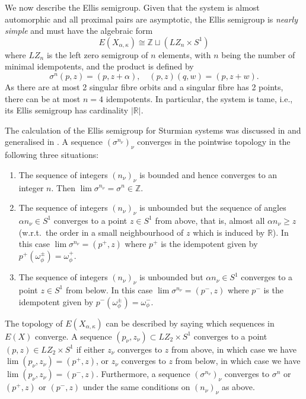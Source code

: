\documentclass[12pt]{amsart}
\theoremstyle{definition}
\numberwithin{equation}{section}
\newcommand{\Z}{\mathbb Z}
\newcommand{\R}{\mathbb{R}}
\newcommand{\al}{\alpha}
\newcommand{\cut}{\kappa}
\begin{document}
We now describe the Ellis semigroup. Given that the system is almost automorphic and all proximal pairs are asymptotic, the Ellis semigroup is {\em nearly simple} \cite{Barge-Kellendonk} and must have the algebraic form
$$E(X_{\al,\cut}) \cong \Z\sqcup ( LZ_n\times S^1) $$
where $LZ_n$ is the left zero semigroup of $n$ elements, with $n$ being the number of minimal idempotents, and the product is defined by
$$ \sigma^n (p,z) = (p,z+\al),\quad (p,z)(q,w) = (p,z+w). $$
As there are at most 2 singular fibre orbits and a singular fibre has 2 points, there can be at most $n=4$ idempotents. In particular, the system is tame, i.e., its Ellis semigroup has cardinality $|\mathbb R|$.
 
The calculation of the Ellis semigroup for Sturmian systems was discussed in \cite[Example 14.10]{GlasnerMegrelishvili2006} and generalised in \cite{Aujogue}.  %
A sequence $(\sigma^{n_\nu})_\nu$ converges in the pointwise topology in the following three situations:
\begin{enumerate}
\item The sequence of integers $(n_\nu)_\nu$ is bounded and hence converges to an integer $n$. Then $\lim \sigma^{n_\nu} = \sigma^n \in \Z$.
\item The sequence of integers $(n_\nu)_\nu$ is unbounded but the sequence of angles $\al n_\nu\in S^1$ converges to a point $z\in S^1$ from above, that is, almost all  $\al n_\nu\geq z$ (w.r.t.\ the order in a small neighbourhood of $z$ which is induced by $\R$). In this case  $\lim \sigma^{n_\nu} = (p^+,z)$ where $p^+$ is the idempotent given by $p^+(\omega_\phi^\pm) = \omega^+_\phi$.
\item The sequence of integers $(n_\nu)_\nu$ is unbounded but $\al n_\nu\in S^1$ converges to a point $z\in S^1$ from below. %
In this case  $\lim \sigma^{n_\nu} = (p^-,z)$ where $p^-$ is the idempotent given by $p^-(\omega_\phi^\pm) = \omega^-_\phi$.
\end{enumerate}
The topology of $E(X_{\al,\cut})$ can be described by saying which sequences in $E(X)$ converge. A sequence $(p_\nu,z_\nu)\subset LZ_2\times S^1$ converges to a point $(p,z)\in LZ_2\times S^1$ if either $z_\nu$ converges to $z$ from above, in which case we have $\lim (p_\nu,z_\nu) = (p^+,z)$, or $z_\nu$ converges to $z$ from below, in which case we have $\lim (p_\nu,z_\nu) = (p^-,z)$. Furthermore, a sequence $(\sigma^{n_\nu})_\nu$ converges to $\sigma^n$ or 
$(p^+,z)$ or $(p^-,z)$ under the same conditions on $(n_\nu)_\nu$ as above. 
\end{document}
